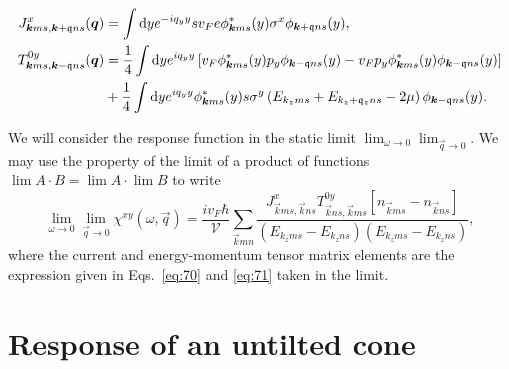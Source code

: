 \begin{align}\label{eq:70}
  J^x_{\bm{k}ms, \bm{k}+\mathfrak{q}ns}(\bm{q}) &= \int \mathrm{d}y
                                                e^{-i q_y y}
                                                s v_F e\phi ^{*}_{\bm{k}m s}(y) \sigma^x
                                                \phi _{\bm{k}+\mathfrak{q}n s}(y),\\
  T^{0y}_{\bm{k} m s, \bm{k}-\mathfrak{q} n s}(\bm{q}) &= \frac{1}{4} \label{eq:71}
                                                           \int \mathrm{d}y
                                                           e^{iq_y y}
                                                           \left[
                                                           v_F \phi ^{*}_{\bm{k}m s}(y) p_y
                                                           \phi _{\bm{k}-\mathfrak{q}n s}(y)
                                                           -
                                                           v_Fp_y \phi ^{*}_{\bm{k}m s}(y)
                                                           \phi _{\bm{k}-\mathfrak{q}n s}(y)
                                                           \right]\\
  \nonumber &+ \frac{1}{4} 
              \int \mathrm{d}y
              e^{iq_y y}
              \phi ^{*}_{\bm{k}m s}(y)
              s\sigma ^y
              \left(
              E_{k_zm s} + E_{k_z+\mathfrak{q}_z n s} - 2 \mu
              \right)
              \phi _{\bm{k}-\mathfrak{q} n s}(y).
\end{align}

We will consider the response function in the static limit \( \lim_{\omega \to 0} \lim_{\vec{q} \to 0} \).
We may use the property of the limit of a product of functions \( \lim A\cdot B = \lim A \cdot \lim B \) to write
\begin{equation}
  \lim_{\omega \to 0} \lim_{\vec{q} \to 0} \chi^{xy}(\omega, \vec{q}) = \frac{i v_F \hbar}{\mathcal{V}} \sum\limits_{\vec{k} m n}^{}
  \frac{
    J^x_{\vec{k} m s, \vec{k} n s} T^{0y}_{\vec{k} n s, \vec{k} m s} [n_{\vec{k} m s} - n_{\vec{k} n s}]
  }{
    (E_{k_z m s} - E_{k_z n s}) (E_{k_z m s}- E_{k_z n s})
  },
\end{equation}
where the current and energy-momentum tensor matrix elements are the expression given in Eqs.~\eqref{eq:70} and \eqref{eq:71} taken in the limit.


\section{Response of an untilted cone}
